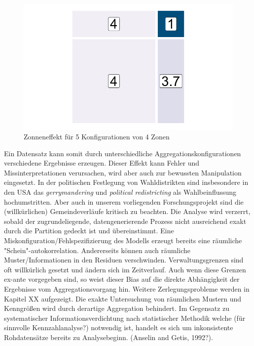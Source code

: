 \begin{figure}[htb]
\begin{minipage}[b]{.32\linewidth}
    \end{minipage}
    \hfill
    \begin{minipage}[b]{.32\linewidth}
       \includegraphics[width=\linewidth,trim={0.5cm 0.5cm 0.5cm 0.5cm},clip]{body/figures/49-zon_f.pdf}
    \end{minipage}
    \caption[Zoneneffekt]{Zonneneffekt für 5 Konfigurationen von 4 Zonen }
    \label{fig_zoning3}
 \end{figure}

Ein Datensatz kann somit durch unterschiedliche Aggregationskonfigurationen verschiedene Ergebnisse erzeugen. %
Dieser Effekt kann Fehler und Missinterpretationen verursachen, wird aber auch zur bewussten Manipulation eingesetzt. 
In der politischen Festlegung von Wahldistrikten sind insbesondere in den USA das \emph{gerrymandering} und \emph{political redistricting} als Wahlbeinflussung hochumstritten.
Aber auch in unserem vorliegenden Forschungsprojekt sind die (willkürlichen) Gemeindeverläufe kritisch zu beachten. Die Analyse wird verzerrt, sobald der zugrundeliegende, datengenerierende
Prozess nicht ausreichend exakt durch die Partition gedeckt ist und übereinstimmt. 
Eine Miskonfiguration/Fehlspezifizierung des Modells erzeugt bereits eine räumliche "Schein"-autokorrelation. 
Andererseits können auch räumliche Muster/Informationen in den Residuen verschwinden.
Verwaltungsgrenzen sind oft willkürlich gesetzt und ändern sich im Zeitverlauf. %
Auch wenn diese Grenzen ex-ante vorgegeben sind, so weist dieser Bias auf die direkte Abhängigkeit der Ergebnisse vom Aggregationsvorgang hin. 
Weitere Zerlegungsprobleme werden in Kapitel XX aufgezeigt. 
Die exakte Untersuchung von räumlichen Mustern und Kenngrößen wird durch derartige Aggregation behindert. Im Gegensatz zu systematischer Informationsverdichtung nach 
statistischer Methodik welche (für sinnvolle Kennzahlanalyse?) notwendig ist, handelt es sich um inkonsistente Rohdatensätze bereits zu Analysebeginn. (Anselin and Getis, 1992?). 

